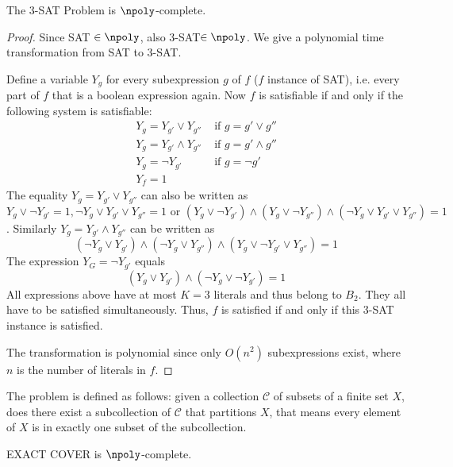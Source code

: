 \begin{cor}
The 3-SAT Problem is $\npoly$-complete.
\end{cor}
\begin{proof}
	Since SAT $\in \npoly$, also 3-SAT$\in \npoly$. We give a polynomial time transformation from SAT to 3-SAT.
	
Define a variable $Y_g$ for every subexpression $g$ of $f$ ($f$ instance of SAT), i.e. every part of $f$ that is a boolean expression again.
Now $f$ is satisfiable if and only if the following system is satisfiable: 
\begin{align*}
	Y_g = Y_{g'} \vee Y_{g''} & \text{ if } g = g' \vee g'' \\
	Y_g = Y_{g'} \wedge Y_{g''}& \text{ if } g = g' \wedge g'' \\
	Y_g = \neg Y_{g'}& \text{ if } g = \neg g' \\
	Y_f = 1 &
\end{align*}
The equality $Y_g = Y_{g'} \vee Y_{g''}$ can also be written as 
\[
	Y_{g} \vee \neg Y_{g'} = 1, \neg Y_g \vee Y_{g'} \vee Y_{g''} = 1 \text{ or } (Y_g\vee\neg Y_{g'})\wedge(Y_g\vee \neg Y_{g''}) \wedge(\neg Y_g \vee Y_{g'} \vee Y_{g''}) = 1 \]. Similarly $Y_g=Y_{g'}\wedge Y_{g''}$ can be written as \[
	(\neg Y_g \vee Y_{g'}) \wedge (\neg Y_g \vee Y_{g''}) \wedge (Y_g \vee \neg Y_{g'} \vee Y_{g''}) = 1
\]
The expression $Y_G = \neg Y_{g'}$ equals \[
	(Y_g \vee Y_{g'}) \wedge (\neg Y_g \vee \neg Y_{g'}) = 1
\]
All expressions above have at most $K=3$ literals and thus belong to $B_2$. They all have to be satisfied simultaneously. Thus, $f$ is satisfied if and only if this 3-SAT instance is satisfied.

The transformation is polynomial since only $O(n^2)$ subexpressions exist, where $n$ is the number of literals in $f$.
\end{proof}

\begin{defn}
	The  problem is defined as follows: given a collection $\mathcal C$ of subsets of a finite set $X$, does there exist a subcollection of $\mathcal C$ that partitions $X$, that means every element of $X$ is in exactly one subset of the subcollection.
\end{defn}

\begin{thm}
	EXACT COVER is $\npoly$-complete.
\end{thm}

